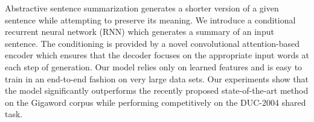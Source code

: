 Abstractive sentence summarization generates a shorter version of a given sentence while attempting to preserve its meaning. We introduce a conditional recurrent neural network (RNN) which generates a summary of an input sentence. The conditioning is provided by a novel convolutional attention-based encoder which ensures that the decoder focuses on the appropriate input words at each step of generation. Our model relies only on learned features and is easy to train in an end-to-end fashion on very large data sets. Our experiments show that the model significantly outperforms the recently proposed state-of-the-art method on the Gigaword corpus while performing competitively on the DUC-2004 shared task.
